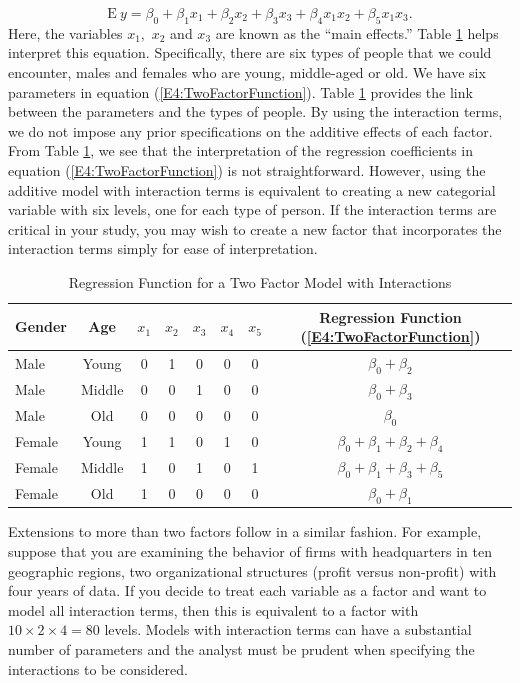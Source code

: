 \begin{equation}\label{E4:TwoFactorFunction}
\mathrm{E}~y = \beta_0 + \beta_1 x_1 + \beta_2 x_2+ \beta_3 x_3 +
\beta_4 x_1 x_2 + \beta_5 x_1 x_3 .
\end{equation}
Here, the variables $x_1,$ $x_2$ and $x_3$ are known as the ``main
effects.'' Table \ref{T4:TwoFactorModel} helps interpret this
equation. Specifically, there are six types of people that we could
encounter, males and females who are young, middle-aged or old. We
have six parameters in equation (\ref{E4:TwoFactorFunction}). Table
\ref{T4:TwoFactorModel} provides the link between the parameters and
the types of people. By using the interaction terms, we do not
impose any prior specifications on the additive effects of each
factor. From Table \ref{T4:TwoFactorModel}, we see that the
interpretation of the regression coefficients in equation
(\ref{E4:TwoFactorFunction}) is not straightforward. However, using
the additive model with interaction terms is equivalent to creating
a new categorial variable with six levels, one for each type of
person. If the interaction terms are critical in your study, you may
wish to create a new factor that incorporates the interaction terms
simply for ease of interpretation.

\begin{table}[htp]
\caption{\label{T4:TwoFactorModel} Regression Function for a Two
Factor Model with Interactions}
\begin{tabular}{lc|ccccc|c}
\hline Gender & Age & $x_1$ & $x_2$ &  $x_3$ &  $x_4$ &  $x_5$ &
Regression Function (\ref{E4:TwoFactorFunction})
\\
\hline
Male & Young    & 0 & 1 & 0 & 0 & 0 & $\beta_0 +\beta_2$\\
Male & Middle   & 0 & 0 & 1 & 0 & 0 & $\beta_0 +\beta_3$\\
Male & Old      & 0 & 0 & 0 & 0 & 0 & $\beta_0 $\\
Female & Young  & 1 & 1 & 0 & 1 & 0 & $\beta_0 +\beta_1+\beta_2+\beta_4$\\
Female & Middle & 1 & 0 & 1 & 0 & 1 & $\beta_0 +\beta_1+\beta_3+\beta_5$\\
Female & Old    & 1 & 0 & 0 & 0 & 0 & $\beta_0 +\beta_1$\\
 \hline
\end{tabular}
 \end{table}

Extensions to more than two factors follow in a similar fashion. For
example, suppose that you are examining the behavior of firms with
headquarters in ten geographic regions, two organizational
structures (profit versus non-profit) with four years of data. If
you decide to treat each variable as a factor and want to model all
interaction terms, then this is equivalent to a factor with $10
\times 2 \times 4 =80$ levels. Models with interaction terms can
have a substantial number of parameters and the analyst must be
prudent when specifying the interactions to be considered.



